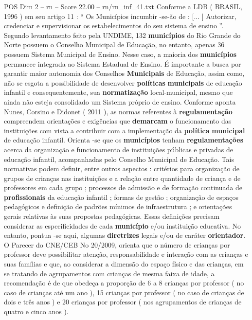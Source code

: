 \begin{textsample}{POS Dim 2 – rn – Score 22.00 – rn/rn\_inf\_41.txt}  \label{ex:f2_pos_244}
Conforme a LDB ( BRASIL, 1996 ) em seu artigo 11 : “ Os Municípios incumbir -se-ão de : [... ] Autorizar, credenciar e supervisionar os estabelecimentos do seu sistema de ensino ”.
Segundo levantamento feito pela UNDIME, 132 \textbf{municípios} do Rio Grande do Norte possuem o Conselho Municipal de Educação, no entanto, apenas 36 possuem Sistema Municipal de Ensino.
Nesse caso, a maioria dos \textbf{municípios} permanece integrada ao Sistema Estadual de Ensino.
É importante a busca por garantir maior autonomia dos Conselhos \textbf{Municipais} de Educação, assim como, não se esgota a possibilidade de desenvolver \textbf{políticas} \textbf{municipais} de educação infantil e consequentemente, sua \textbf{normatização} local-municipal, mesmo que ainda não esteja consolidado um Sistema próprio de ensino.
Conforme aponta Nunes, Corsino e Didonet ( 2011 ), as normas referentes à \textbf{regulamentação} compreendem orientações e exigências que \textbf{demarcam} o funcionamento das instituições com vista a contribuir com a implementação da \textbf{política} \textbf{municipal} de educação infantil.
Orienta -se que os \textbf{municípios} tenham \textbf{regulamentações} acerca da organização e funcionamento de instituições públicas e privadas de educação infantil, acompanhadas pelo Conselho Municipal de Educação.
Tais normativas podem definir, entre outros aspectos : critérios para organização de grupos de crianças nas instituições e a relação entre quantidade de criança e de professores em cada grupo ; processos de admissão e de formação continuada de \textbf{profissionais} da educação infantil ; formas de gestão ; organização de espaços pedagógicos e definição de padrões mínimos de infraestrutura ; e orientações gerais relativas às suas propostas pedagógicas.
Essas definições precisam considerar as especificidades de cada \textbf{município} e/ou instituição educativa.
No entanto, pontua -se aqui, algumas \textbf{diretrizes} legais e/ou de caráter \textbf{orientador}.
O Parecer do CNE/CEB No 20/2009, orienta que o número de crianças por professor deve possibilitar atenção, responsabilidade e interação com as crianças e suas famílias e que, ao considerar a dimensão do espaço físico e das crianças, em se tratando de agrupamentos com crianças de mesma faixa de idade, a recomendação é de que obedeça a proporção de 6 a 8 crianças por professor ( no caso de crianças até um ano ), 15 crianças por professor ( no caso de crianças de dois e três anos ) e 20 crianças por professor ( nos agrupamentos de crianças de quatro e cinco anos ).

\end{textsample}
